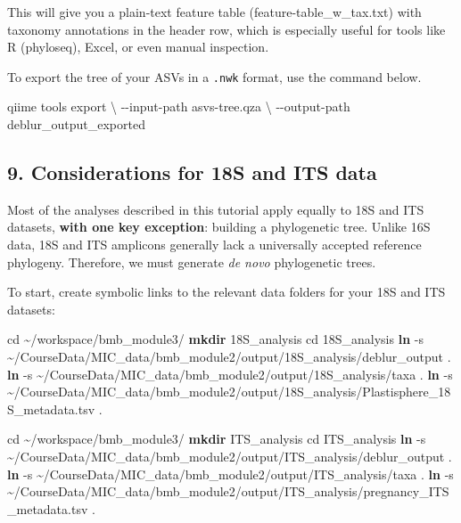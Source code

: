 \documentclass[
]{book}
\newenvironment{Shaded}{\begin{snugshade}}{\end{snugshade}}
\newcommand{\AttributeTok}[1]{\textcolor[rgb]{0.13,0.29,0.53}{#1}}
\newcommand{\BuiltInTok}[1]{#1}
\newcommand{\DataTypeTok}[1]{\textcolor[rgb]{0.13,0.29,0.53}{#1}}
\newcommand{\ExtensionTok}[1]{#1}
\newcommand{\FunctionTok}[1]{\textcolor[rgb]{0.13,0.29,0.53}{\textbf{#1}}}
\newcommand{\NormalTok}[1]{#1}
\begin{document}
This will give you a plain-text feature table (feature-table\_w\_tax.txt) with taxonomy annotations in the header row, which is especially useful for tools like R (phyloseq), Excel, or even manual inspection.

To export the tree of your ASVs in a \texttt{.nwk} format, use the command below.

\begin{Shaded}
\begin{Highlighting}[]
\ExtensionTok{qiime}\NormalTok{ tools export }\DataTypeTok{\textbackslash{}}
  \AttributeTok{{-}{-}input{-}path}\NormalTok{ asvs{-}tree.qza }\DataTypeTok{\textbackslash{}}
  \AttributeTok{{-}{-}output{-}path}\NormalTok{ deblur\_output\_exported}
\end{Highlighting}
\end{Shaded}

\subsection{9. Considerations for 18S and ITS data}\label{18s-its}

Most of the analyses described in this tutorial apply equally to 18S and ITS datasets, \textbf{with one key exception}: building a phylogenetic tree. Unlike 16S data, 18S and ITS amplicons generally lack a universally accepted reference phylogeny. Therefore, we must generate \emph{de novo} phylogenetic trees.

To start, create symbolic links to the relevant data folders for your 18S and ITS datasets:

\begin{Shaded}
\begin{Highlighting}[]
\BuiltInTok{cd}\NormalTok{ \textasciitilde{}/workspace/bmb\_module3/}
\FunctionTok{mkdir}\NormalTok{ 18S\_analysis}
\BuiltInTok{cd}\NormalTok{ 18S\_analysis}
\FunctionTok{ln} \AttributeTok{{-}s}\NormalTok{ \textasciitilde{}/CourseData/MIC\_data/bmb\_module2/output/18S\_analysis/deblur\_output .}
\FunctionTok{ln} \AttributeTok{{-}s}\NormalTok{ \textasciitilde{}/CourseData/MIC\_data/bmb\_module2/output/18S\_analysis/taxa .}
\FunctionTok{ln} \AttributeTok{{-}s}\NormalTok{ \textasciitilde{}/CourseData/MIC\_data/bmb\_module2/output/18S\_analysis/Plastisphere\_18S\_metadata.tsv .}

\BuiltInTok{cd}\NormalTok{ \textasciitilde{}/workspace/bmb\_module3/}
\FunctionTok{mkdir}\NormalTok{ ITS\_analysis}
\BuiltInTok{cd}\NormalTok{ ITS\_analysis}
\FunctionTok{ln} \AttributeTok{{-}s}\NormalTok{ \textasciitilde{}/CourseData/MIC\_data/bmb\_module2/output/ITS\_analysis/deblur\_output .}
\FunctionTok{ln} \AttributeTok{{-}s}\NormalTok{ \textasciitilde{}/CourseData/MIC\_data/bmb\_module2/output/ITS\_analysis/taxa .}
\FunctionTok{ln} \AttributeTok{{-}s}\NormalTok{ \textasciitilde{}/CourseData/MIC\_data/bmb\_module2/output/ITS\_analysis/pregnancy\_ITS\_metadata.tsv .}
\end{Highlighting}
\end{Shaded}
\end{document}
